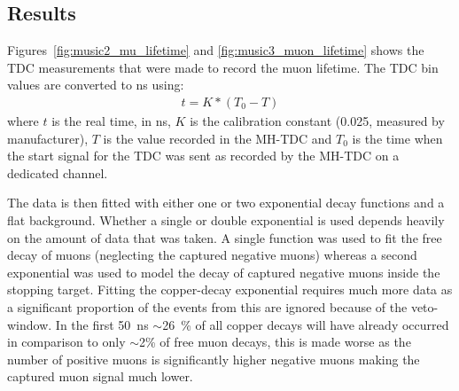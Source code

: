 \subsection{Results} %
\label{sec:results} 
Figures~\ref{fig:music2_mu_lifetime} and \ref{fig:music3_muon_lifetime} shows the TDC measurements that were made to record the muon lifetime. The TDC bin values are converted to ns using:
\begin{align}
  t = K*(T_0-T)
\end{align}
where \( t \) is the real time, in ns, \( K \) is the calibration constant (0.025, measured by manufacturer), \( T \) is the value recorded in the MH-TDC and \( T_0 \) is the time when the start signal for the TDC was sent as recorded by the MH-TDC on a dedicated channel.

The data is then fitted with either one or two exponential decay functions and a flat background. Whether a single or double exponential is used depends heavily on the amount of data that was taken. A single function was used to fit the free decay of muons (neglecting the captured negative muons) whereas a second exponential was used to model the decay of captured negative muons inside the stopping target. Fitting the copper-decay exponential requires much more data as a significant proportion of the events from this are ignored because of the veto-window. In the first 50~ns \(\sim\)26~\% of all copper decays will have already occurred in comparison to only \(\sim\)2\% of free muon decays, this is made worse as the number of positive muons is significantly higher negative muons making the captured muon signal much lower.

